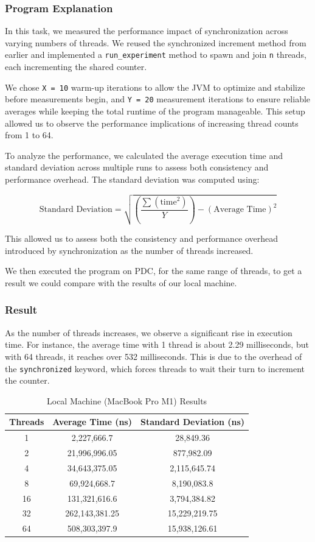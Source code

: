 \documentclass{article}
\begin{document}
\subsubsection{Program Explanation}
In this task, we measured the performance impact of synchronization across varying numbers of threads. We reused the synchronized increment method from earlier and implemented a \texttt{run\_experiment} method to spawn and join \texttt{n} threads, each incrementing the shared counter.

We chose \texttt{X = 10} warm-up iterations to allow the JVM to optimize and stabilize before measurements begin, and \texttt{Y = 20} measurement iterations to ensure reliable averages while keeping the total runtime of the program manageable. This setup allowed us to observe the performance implications of increasing thread counts from 1 to 64.

To analyze the performance, we calculated the average execution time and standard deviation across multiple runs to assess both consistency and performance overhead. The standard deviation was computed using:


\[
\text{Standard Deviation} = \sqrt{\left(\frac{\sum (\text{time}^2)}{Y}\right) - \left(\text{Average Time}\right)^2}
\]

This allowed us to assess both the consistency and performance overhead introduced by synchronization as the number of threads increased.

We then executed the program on PDC, for the same range of threads, to get a result we could compare with the results of our local machine.


\subsubsection{Result}
As the number of threads increases, we observe a significant rise in execution time. For instance, the average time with 1 thread is about 2.29 milliseconds, but with 64 threads, it reaches over 532 milliseconds. This is due to the overhead of the \texttt{synchronized} keyword, which forces threads to wait their turn to increment the counter.

\begin{table}[H]
\centering
\begin{tabular}{|c|c|c|}
\hline
\textbf{Threads} & \textbf{Average Time (ns)} & \textbf{Standard Deviation (ns)} \\
\hline
1   & 2,227,666.7     & 28,849.36         \\
2   & 21,996,996.05   & 877,982.09        \\
4   & 34,643,375.05   & 2,115,645.74      \\
8   & 69,924,668.7    & 8,190,083.8       \\
16  & 131,321,616.6   & 3,794,384.82      \\
32  & 262,143,381.25  & 15,229,219.75     \\
64  & 508,303,397.9   & 15,938,126.61     \\
\hline
\end{tabular}
\caption{Local Machine (MacBook Pro M1) Results}
\end{table}
\end{document}

